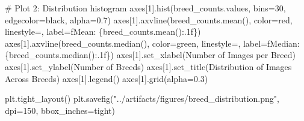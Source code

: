 \documentclass[
  letterpaper,
  DIV=11,
  numbers=noendperiod]{scrartcl}
\newenvironment{Shaded}{\begin{snugshade}}{\end{snugshade}}
\newcommand{\CommentTok}[1]{\textcolor[rgb]{0.37,0.37,0.37}{#1}}
\newcommand{\DecValTok}[1]{\textcolor[rgb]{0.68,0.00,0.00}{#1}}
\newcommand{\FloatTok}[1]{\textcolor[rgb]{0.68,0.00,0.00}{#1}}
\newcommand{\NormalTok}[1]{\textcolor[rgb]{0.00,0.23,0.31}{#1}}
\newcommand{\OperatorTok}[1]{\textcolor[rgb]{0.37,0.37,0.37}{#1}}
\newcommand{\SpecialCharTok}[1]{\textcolor[rgb]{0.37,0.37,0.37}{#1}}
\newcommand{\SpecialStringTok}[1]{\textcolor[rgb]{0.13,0.47,0.30}{#1}}
\newcommand{\StringTok}[1]{\textcolor[rgb]{0.13,0.47,0.30}{#1}}
\renewenvironment{Shaded}{%
  \begin{tcolorbox}[%
    enhanced,%
    colback=codebg,%
    colframe=codebg,%
    borderline west={3pt}{0pt}{sectionblue},%
    boxrule=0pt,%
    arc=0pt,%
    boxsep=5pt,%
    left=2mm,%
    right=2mm,%
    top=2mm,%
    bottom=2mm%
  ]%
}{%
  \end{tcolorbox}%
}
\begin{document}
\begin{Shaded}
\begin{Highlighting}[]
\CommentTok{\# Plot 2: Distribution histogram}
\NormalTok{axes[}\DecValTok{1}\NormalTok{].hist(breed\_counts.values, bins}\OperatorTok{=}\DecValTok{30}\NormalTok{, edgecolor}\OperatorTok{=}\StringTok{\textquotesingle{}black\textquotesingle{}}\NormalTok{, alpha}\OperatorTok{=}\FloatTok{0.7}\NormalTok{)}
\NormalTok{axes[}\DecValTok{1}\NormalTok{].axvline(breed\_counts.mean(), color}\OperatorTok{=}\StringTok{\textquotesingle{}red\textquotesingle{}}\NormalTok{, linestyle}\OperatorTok{=}\StringTok{\textquotesingle{}{-}{-}\textquotesingle{}}\NormalTok{, label}\OperatorTok{=}\SpecialStringTok{f\textquotesingle{}Mean: }\SpecialCharTok{\{}\NormalTok{breed\_counts}\SpecialCharTok{.}\NormalTok{mean()}\SpecialCharTok{:.1f\}}\SpecialStringTok{\textquotesingle{}}\NormalTok{)}
\NormalTok{axes[}\DecValTok{1}\NormalTok{].axvline(breed\_counts.median(), color}\OperatorTok{=}\StringTok{\textquotesingle{}green\textquotesingle{}}\NormalTok{, linestyle}\OperatorTok{=}\StringTok{\textquotesingle{}{-}{-}\textquotesingle{}}\NormalTok{, label}\OperatorTok{=}\SpecialStringTok{f\textquotesingle{}Median: }\SpecialCharTok{\{}\NormalTok{breed\_counts}\SpecialCharTok{.}\NormalTok{median()}\SpecialCharTok{:.1f\}}\SpecialStringTok{\textquotesingle{}}\NormalTok{)}
\NormalTok{axes[}\DecValTok{1}\NormalTok{].set\_xlabel(}\StringTok{\textquotesingle{}Number of Images per Breed\textquotesingle{}}\NormalTok{)}
\NormalTok{axes[}\DecValTok{1}\NormalTok{].set\_ylabel(}\StringTok{\textquotesingle{}Number of Breeds\textquotesingle{}}\NormalTok{)}
\NormalTok{axes[}\DecValTok{1}\NormalTok{].set\_title(}\StringTok{\textquotesingle{}Distribution of Images Across Breeds\textquotesingle{}}\NormalTok{)}
\NormalTok{axes[}\DecValTok{1}\NormalTok{].legend()}
\NormalTok{axes[}\DecValTok{1}\NormalTok{].grid(alpha}\OperatorTok{=}\FloatTok{0.3}\NormalTok{)}

\NormalTok{plt.tight\_layout()}
\NormalTok{plt.savefig(}\StringTok{"../artifacts/figures/breed\_distribution.png"}\NormalTok{, dpi}\OperatorTok{=}\DecValTok{150}\NormalTok{, bbox\_inches}\OperatorTok{=}\StringTok{\textquotesingle{}tight\textquotesingle{}}\NormalTok{)}


\end{Highlighting}
\end{Shaded}
\end{document}
